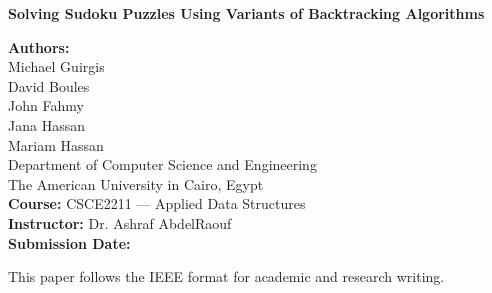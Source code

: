 \documentclass[conference]{IEEEtran}
\begin{document}
\begin{titlepage}
    \centering
    \vspace*{3cm}
    {\LARGE \textbf{Solving Sudoku Puzzles Using Variants of Backtracking Algorithms}\par}
    \vspace{2cm}

    {\large
    \textbf{Authors:}\\[6pt]
    Michael Guirgis\\
    David Boules\\
    John Fahmy\\
    Jana Hassan\\
    Mariam Hassan\\[1.5cm]
    
    Department of Computer Science and Engineering\\
    The American University in Cairo, Egypt\\[1.5cm]
    
    \textbf{Course:} CSCE2211 — Applied Data Structures\\[6pt]
    \textbf{Instructor:} Dr. Ashraf AbdelRaouf\\[6pt]
    \textbf{Submission Date:} \\[2cm]
    }
    
    \vfill
    {\small This paper follows the IEEE format for academic and research writing.}
\end{titlepage}




\begin{abstract}
(tentative) In this paper, we discuss various algorithms used to solve different types of Sudoku puzzles, including the standard $9\times9$, mini Sudoku, and $16\times16$ variants. We begin by introducing the basic structure and rules of the game, followed by a comparison between heuristic and backtracking-based approaches. The study then focuses on detailed implementations of backtracking algorithms, specifically Depth-First Search (DFS) and Dancing Links (DLX). We conclude that Dancing Links provides the most efficient and flexible solution due to the use of a linked-list data structure, which allows for rapid constraint removal and restoration during the search process.
\end{abstract}
\end{document}
